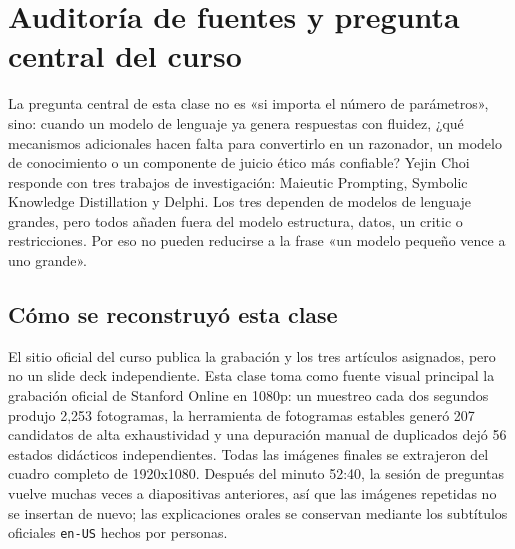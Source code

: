 \documentclass[a4paper]{article}
\begin{document}
\makecscover

\section{Auditoría de fuentes y pregunta central del curso}

La pregunta central de esta clase no es «si importa el número de parámetros», sino: cuando un modelo de lenguaje ya genera respuestas con fluidez, ¿qué mecanismos adicionales hacen falta para convertirlo en un razonador, un modelo de conocimiento o un componente de juicio ético más confiable? Yejin Choi responde con tres trabajos de investigación: Maieutic Prompting, Symbolic Knowledge Distillation y Delphi. Los tres dependen de modelos de lenguaje grandes, pero todos añaden fuera del modelo estructura, datos, un critic o restricciones. Por eso no pueden reducirse a la frase «un modelo pequeño vence a uno grande».

\subsection{Cómo se reconstruyó esta clase}

El sitio oficial del curso publica la grabación y los tres artículos asignados, pero no un slide deck independiente. Esta clase toma como fuente visual principal la grabación oficial de Stanford Online en 1080p: un muestreo cada dos segundos produjo 2,253 fotogramas, la herramienta de fotogramas estables generó 207 candidatos de alta exhaustividad y una depuración manual de duplicados dejó 56 estados didácticos independientes. Todas las imágenes finales se extrajeron del cuadro completo de 1920x1080. Después del minuto 52:40, la sesión de preguntas vuelve muchas veces a diapositivas anteriores, así que las imágenes repetidas no se insertan de nuevo; las explicaciones orales se conservan mediante los subtítulos oficiales \texttt{en-US} hechos por personas.
\end{document}
